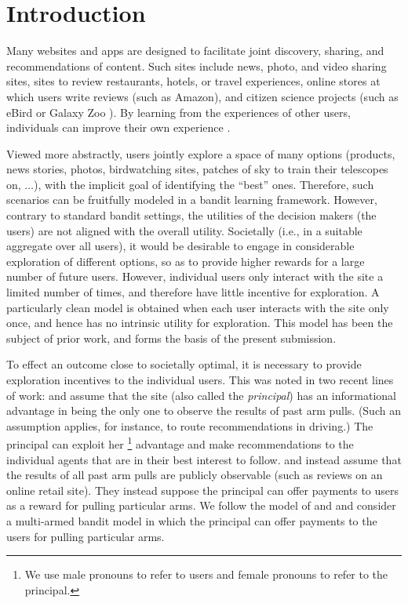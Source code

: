 \section{Introduction}

Many websites and apps are designed to facilitate joint discovery,
sharing, and recommendations of content.
Such sites include news, photo, and video sharing sites,
sites to review restaurants, hotels, or travel experiences,
online stores at which users write reviews (such as Amazon),
and citizen science projects
(such as eBird \citep{sullivan2009ebird,xue-ebird} or Galaxy Zoo \citep{lintott-galaxy-zoo}).
By learning from the experiences of other users, individuals can
improve their own experience \citep{schmit2017human}.

Viewed more abstractly, users jointly explore a space of
many options (products, news stories, photos, birdwatching sites,
patches of sky to train their telescopes on, $\ldots$),
with the implicit goal of identifying the ``best'' ones.
Therefore, such scenarios can be fruitfully modeled in a bandit
learning framework.
However, contrary to standard bandit settings, the utilities of the
decision makers (the users) are not aligned with the overall utility.
Societally (i.e., in a suitable aggregate over all users),
it would be desirable to engage in considerable exploration of
different options, so as to provide higher rewards for a large number
of future users.
However, individual users only interact with the site a limited number
of times, and therefore have little incentive for exploration.
A particularly clean model is obtained when each user interacts with the
site only once, and hence has no intrinsic utility for exploration. 
This model has been the subject of prior work, and forms the basis of
the present submission.

To effect an outcome close to societally optimal,
it is necessary to provide exploration incentives to the individual users.
This was noted in two recent lines of work:
\citet{kremer2014implementing}
and \citet{mansour2015bayesian,mansour2016bayesian}
assume that the site (also called the \emph{principal}) has an
informational advantage in being the only one to observe the results
of past arm pulls.
(Such an assumption applies, for instance, to route recommendations in
driving.)
The principal can exploit her%
\footnote{We use male pronouns to refer to users and female pronouns
  to refer to the principal.}
advantage and make recommendations to the individual agents that 
are in their best interest to follow.
\citet{frazier2014incentivizing} and 
\citet{han2015incentivizing} instead assume that the results of all
past arm pulls are publicly observable
(such as reviews on an online retail site).
They instead suppose the principal can offer payments to users as
a reward for pulling particular arms.
We follow the model of \citet{frazier2014incentivizing} and
\citet{han2015incentivizing} 
and consider a multi-armed bandit model in which the principal can
offer payments to the users for pulling particular arms.


